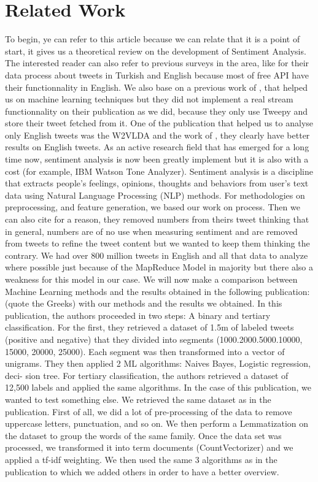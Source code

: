 \documentclass{acmtog} %
\begin{document}
\section{Related Work}
\label{sec:related_work}
To begin, ye can refer to this article \cite{Palpanas11} because we can relate that it is a point of start, it gives us a theoretical review on the development of Sentiment Analysis. The interested reader can also refer to previous surveys in the area, like \cite{Ayvazb17} for their data process about tweets in Turkish and English  because most of free API have their functionnality in English. We also base on a previous work of \cite{Badhani17}, that helped us on machine learning techniques but they did not implement a real stream functionnality on their publication as we did, because they only use Tweepy and store their tweet fetched from it. One of the publication that helped us to analyse only English tweets was the W2VLDA and the work of \cite{Cuadros17}, they clearly have better results on English tweets. As an active research field that has emerged for a long time now, sentiment analysis is now been greatly implement but it is also with a cost (for example, IBM Watson Tone Analyzer). Sentiment analysis is a discipline that extracts people’s feelings, opinions, thoughts and behaviors from user’s text data using Natural Language Processing (NLP) methods. For methodologies on preprocessing, and feature generation, we based our work on process. Then we can also cite for a reason, they removed numbers from theirs tweet thinking that in general, numbers are of no use when measuring sentiment and are removed from tweets to refine the tweet content but we wanted to keep them thinking the contrary. We had over 800 million tweets in English and all that data to analyze where possible just because of the MapReduce Model in majority but there also a weakness for this model in our case.
We will now make a comparison between Machine Learning methods and the results obtained in the following publication: (quote the Greeks) with our methods and the results we obtained.
In this publication, the authors proceeded in two steps: A binary and tertiary classification. For the first, they retrieved a dataset of 1.5m of labeled tweets (positive and negative) that they divided into segments (1000.2000.5000.10000, 15000, 20000, 25000). Each segment was then transformed into a vector of unigrams. They then applied 2 ML algorithms: Naives Bayes, Logistic regression, deci- sion tree. For tertiary classification, the authors retrieved a dataset of 12,500 labels and applied the same algorithms.
In the case of this publication, we wanted to test something else. We retrieved the same dataset as in the publication. First of all, we did a lot of pre-processing of the data to remove uppercase letters, punctuation, and so on. We then perform a Lemmatization on the dataset to group the words of the same family. Once the data set was processed, we transformed it into term documents (CountVectorizer) and we applied a tf-idf weighting.
We then used the same 3 algorithms as in the publication to which we added others in order to have a better overview.
\end{document}
